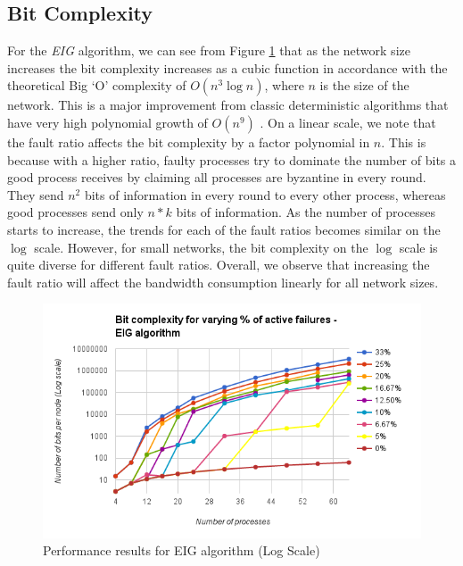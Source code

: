 \subsection{Bit Complexity} For the \textit{EIG} algorithm, we can see from
Figure \ref{fig:eig} that as the network size increases the bit complexity
increases as a cubic function in accordance with the theoretical Big `O'
complexity of $O(n^3 \log n)$, where $n$ is the size of the network. This is
a major improvement from classic deterministic algorithms that have very high
polynomial growth of $O(n^9)$ \cite{GarayM98}. On a linear scale, we note that
the fault ratio affects the bit complexity by a factor polynomial in $n$. This is because
with a higher ratio, faulty processes try to dominate the number of bits a good
process receives by claiming all processes are byzantine in every round. They
send $n^2$ bits of information in every round to every other process, whereas
good processes send only $n*k$ bits of information. As the number of processes
starts to increase, the trends for each of the fault ratios becomes similar on the $\log$ scale.
However, for small networks, the bit complexity on the $\log$ scale is quite diverse for different
fault ratios. Overall, we observe that increasing the fault ratio will affect
the bandwidth consumption linearly for all network sizes.
\begin{figure}[ht] \centering
    \vspace{-2mm}
    \includegraphics[scale=0.4]{eig} 
    \caption{Performance results for EIG algorithm (Log Scale)} \label{fig:eig}
    \vspace{-4mm}
\end{figure}

